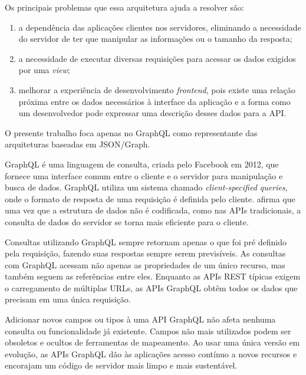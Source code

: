 Os principais problemas que essa arquitetura ajuda a resolver são: 

\begin{enumerate}[label=\alph*)]

\item a dependência das aplicações clientes nos servidores, eliminando a necessidade do servidor de ter que manipular as informações ou o tamanho da resposta; 

\item a necessidade de executar diversas requisições para acessar os dados exigidos por uma \textit{view};

\item melhorar a experiência de desenvolvimento \textit{frontend}, pois existe uma relação próxima entre os dados necessários à interface da aplicação e a forma como um desenvolvedor pode expressar uma descrição desses dados para a API. 

\end{enumerate}

O presente trabalho foca apenas no GraphQL como representante das arquiteturas baseadas em JSON/Graph.

GraphQL é uma linguagem de consulta, criada pelo Facebook em 2012, que fornece uma interface comum entre o cliente e o servidor para manipulação e busca de dados. GraphQL utiliza um sistema chamado \textit{client-specified queries}, onde o formato de resposta de uma requisição é definida pelo cliente.  afirma que uma vez que a estrutura de dados não é codificada, como nas APIs tradicionais, a consulta de dados do servidor se torna mais eficiente para o cliente.

Consultas utilizando GraphQL sempre retornam apenas o que foi pré definido pela requisição, fazendo suas respostas sempre serem previsíveis. As consultas com GraphQL acessam não apenas as propriedades de um único recurso, mas também seguem as referências entre eles. Enquanto as APIs REST típicas exigem o carregamento de múltiplas URLs, as APIs GraphQL obtêm todos os dados que precisam em uma única requisição.

Adicionar novos campos ou tipos à uma API GraphQL não afeta nenhuma consulta ou funcionalidade já existente. Campos não mais utilizados podem ser obsoletos e ocultos de ferramentas de mapeamento. Ao usar uma única versão em evolução, as APIs GraphQL dão às aplicações acesso contínuo a novos recursos e encorajam um código de servidor mais limpo e mais sustentável.

